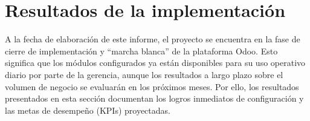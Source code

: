 \section{Resultados de la implementación}
\begin{indentedsubsection}
A la fecha de elaboración de este informe, el proyecto se encuentra en la fase de cierre de implementación y ``marcha blanca'' de la plataforma Odoo. Esto significa que los módulos configurados ya están disponibles para su uso operativo diario por parte de la gerencia, aunque los resultados a largo plazo sobre el volumen de negocio se evaluarán en los próximos meses. Por ello, los resultados presentados en esta sección documentan los logros inmediatos de configuración y las metas de desempeño (KPIs) proyectadas.
\end{indentedsubsection}

